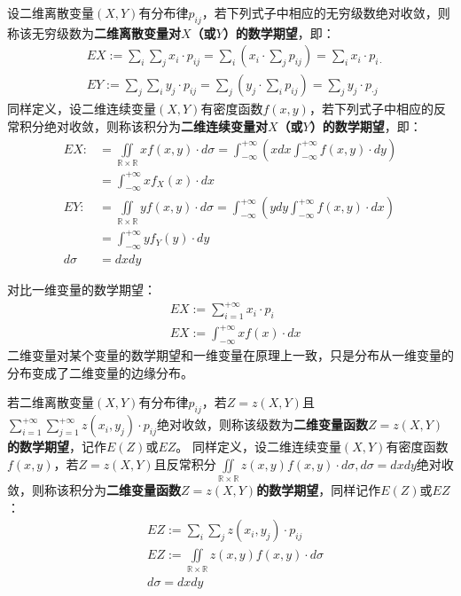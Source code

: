\begin{definition}[二维随机变量的数学期望]
设二维离散变量$\left( X,Y \right) $有分布律$p_{ij}$，若下列式子中相应的无穷级数绝对收敛，则称该无穷级数为{\bf 二维离散变量对$X$（或$Y$）的数学期望}，即：
\begin{align*}
&EX:=\sum_i{\sum_j{x_i\cdot p_{ij}}}=\sum_i{\left( x_i\cdot \sum_j{p_{ij}} \right)}=\sum_i{x_i\cdot p_{i\cdot}} \\
&EY:=\sum_j{\sum_i{y_j\cdot p_{ij}}}=\sum_j{\left( y_j\cdot \sum_i{p_{ij}} \right)}=\sum_j{y_j\cdot p_{\cdot j}}
\end{align*}
同样定义，设二维连续变量$\left( X,Y \right) $有密度函数$f\left( x,y \right) $，若下列式子中相应的反常积分绝对收敛，则称该积分为{\bf 二维连续变量对$X$（或$Y$）的数学期望}，即：
\begin{align*}
EX:&=\iint\limits_{\mathbb{R} \times \mathbb{R}}{xf\left( x,y \right) \cdot d\sigma}=\int_{-\infty}^{+\infty}{\left( xdx\int_{-\infty}^{+\infty}{f\left( x,y \right) \cdot dy} \right)} \\
&=\int_{-\infty}^{+\infty}{xf_X\left( x \right) \cdot dx} \\
EY:&=\iint\limits_{\mathbb{R} \times \mathbb{R}}{yf\left( x,y \right) \cdot d\sigma}=\int_{-\infty}^{+\infty}{\left( ydy\int_{-\infty}^{+\infty}{f\left( x,y \right) \cdot dx} \right)} \\
&=\int_{-\infty}^{+\infty}{yf_Y\left( y \right) \cdot dy} \\
d\sigma &=dxdy
\end{align*}
\end{definition}

\begin{tcolorbox}
对比一维变量的数学期望：
\begin{align*}
&EX:=\sum_{i=1}^{+\infty}{x_i\cdot p_i} \\
&EX:=\int_{-\infty}^{+\infty}{xf\left( x \right) \cdot dx}
\end{align*}
二维变量对某个变量的数学期望和一维变量在原理上一致，只是分布从一维变量的分布变成了二维变量的边缘分布。
\end{tcolorbox}

\begin{definition}[二维随机变量函数的数学期望]
若二维离散变量$\left( X,Y \right) $有分布律$p_{ij}$，若$Z=z\left( X,Y \right) $且$\sum_{i=1}^{+\infty}{\sum_{j=1}^{+\infty}{z\left( x_i,y_j \right) \cdot p_{ij}}}$绝对收敛，则称该级数为{\bf 二维变量函数$Z=z\left( X,Y \right) $的数学期望}，记作$E\left( Z \right) $或$EZ$。
同样定义，设二维连续变量$\left( X,Y \right) $有密度函数$f\left( x,y \right) $，若$Z=z\left( X,Y \right) $且反常积分$\iint\limits_{\mathbb{R} \times \mathbb{R}}{z\left( x,y \right) f\left( x,y \right) \cdot d\sigma},  d\sigma =dxdy$绝对收敛，则称该积分为{\bf 二维变量函数$Z=z\left( X,Y \right) $的数学期望}，同样记作$E\left( Z \right) $或$EZ$：
\begin{align*}
&EZ:=\sum_i{\sum_j{z\left( x_i,y_j \right) \cdot p_{ij}}} \\
&EZ:=\iint\limits_{\mathbb{R} \times \mathbb{R}}{z\left( x,y \right) f\left( x,y \right) \cdot d\sigma} \\
&d\sigma =dxdy
\end{align*}
\end{definition}

